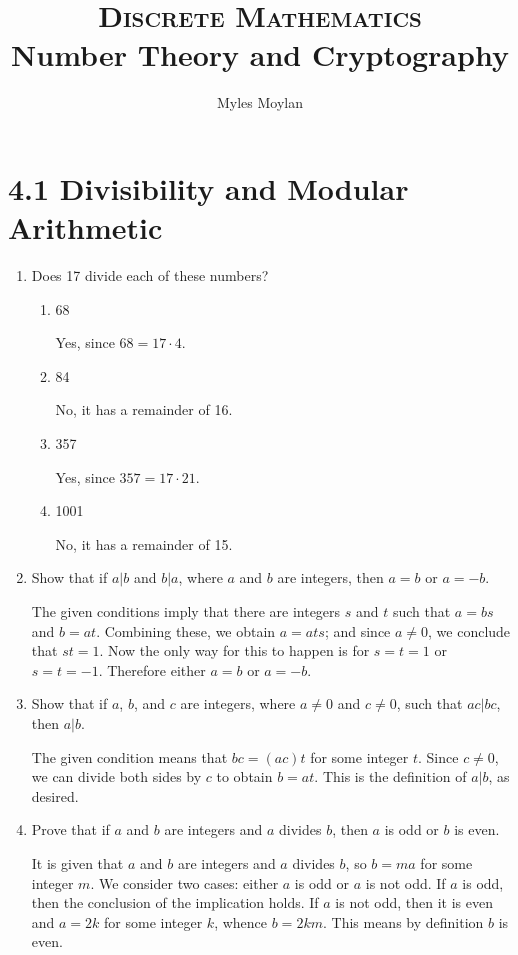 \documentclass[11pt]{article}
\title{	
	\normalfont \normalsize 
	\textsc{Discrete Mathematics} \\
	\huge Number Theory and Cryptography \\
}
\author{Myles Moylan} %
\date{} %
\begin{document}
	
\maketitle

\section*{\textbf{4.1 Divisibility and Modular Arithmetic}}
\begin{enumerate}[label=\textbf{\arabic*.}]
	\item Does 17 divide each of these numbers?
	
	\begin{enumerate}[label=\textbf{\alph*)}]
		\item 68
		
		Yes, since $68 = 17 \cdot 4$.
		
		\item 84
		
		No, it has a remainder of 16.
		
		\item 357
		
		Yes, since $357 = 17 \cdot 21$.
		
		\item 1001
		
		No, it has a remainder of 15.
	\end{enumerate}

	\item Show that if $a | b$ and $b | a$, where $a$ and $b$ are integers, then $a = b$ or $a = -b$.
	
	The given conditions imply that there are integers $s$ and $t$ such that $a = bs$ and $b = at$. Combining these, we obtain $a = ats$; and since $a \ne 0$, we conclude that $st = 1$. Now the only way for this to happen is for $s = t = 1$ or $s = t = -1$. Therefore either $a = b$ or $a = -b$.
	
	\item Show that if $a$, $b$, and $c$ are integers, where $a \ne 0$ and $c \ne 0$, such that $ac | bc$, then $a | b$.
	
	The given condition means that $bc = (ac)t$ for some integer $t$. Since $c \ne 0$, we can divide both sides by $c$ to obtain $b = at$. This is the definition of $a | b$, as desired.
	
	\item Prove that if $a$ and $b$ are integers and $a$ divides $b$, then $a$ is odd or $b$ is even.
	
	It is given that $a$ and $b$ are integers and $a$ divides $b$, so $b = ma$ for some integer $m$. We consider two cases: either $a$ is odd or $a$ is not odd. If $a$ is odd, then the conclusion of the implication holds. If $a$ is not odd, then it is even and $a = 2k$ for some integer $k$, whence $b = 2km$. This means by definition $b$ is even.
	

\end{enumerate}
\end{document}
